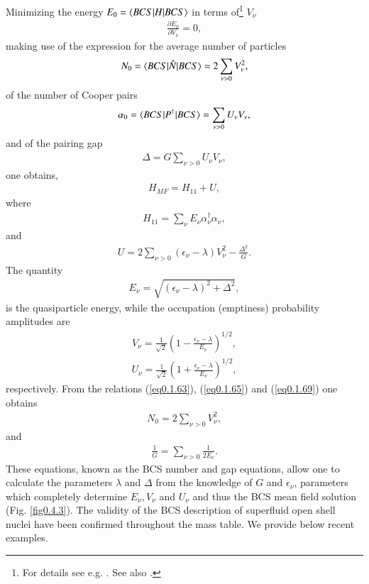 Minimizing the energy $E_0=\langle {BCS|H|BCS} \rangle$ in terms of\footnote{For details see e.g. \cite{Ragnarsson:05}. See also \cite{Nathan:65}.} $V_\nu$
\begin{align}\label{eq0.1.62}
\frac{\partial E_0}{\partial V_\nu}=0,
\end{align}
 making use of the expression for the average number of particles
\begin{align}\label{eq0.1.63}
N_0=\langle {BCS|\hat N|BCS} \rangle=2\sum_{\nu>0}V_\nu^2,
\end{align}
 of the number of Cooper pairs
\begin{align}\label{eq0.1.64}
\alpha_0=\langle {BCS|P^\dagger|BCS} \rangle=\sum_{\nu>0}U_\nu V_\nu,
\end{align}
and of the pairing gap
\begin{align}\label{eq0.1.65}
\Delta=G\sum_{\nu>0}U_\nu V_{\nu},
\end{align}
one obtains,
\begin{align}\label{eq0.1.66}
H_{MF}=H_{11}+U,
\end{align}
where 
\begin{align}\label{eq0.1.67}
H_{11}=\sum_\nu E_\nu \alpha^\dagger_\nu\alpha_\nu,
\end{align}
and
\begin{align}\label{eq0.1.68}
U=2\sum_{\nu>0}(\epsilon_\nu-\lambda)V^2_\nu-\frac{\Delta^2}{G}.
\end{align}
The quantity
\begin{align}\label{eq0.1.69}
E_\nu=\sqrt{(\epsilon_\nu-\lambda)^2+\Delta^2},
\end{align}
is the quasiparticle energy, while the occupation (emptiness) probability amplitudes are
\begin{align}\label{eq0.1.70}
V_\nu=\frac{1}{\sqrt{2}}\left(1-\frac{\epsilon_\nu-\lambda}{E_\nu}\right)^{1/2},
\end{align}
\begin{align}\label{eq0.1.71}
U_\nu=\frac{1}{\sqrt{2}}\left(1+\frac{\epsilon_\nu-\lambda}{E_\nu}\right)^{1/2},
\end{align}
 respectively. From the relations (\ref{eq0.1.63}),  (\ref{eq0.1.65}) and (\ref{eq0.1.69}) one obtains
\begin{align}\label{eq0.1.72}
N_0=2\sum_{\nu>0}V^2_\nu,
\end{align}
 and 
\begin{align}\label{eq0.1.73}
\frac{1}{G}=\sum_{\nu>0}\frac{1}{2E_\nu}.
\end{align}
These equations, known as the BCS number and gap equations, allow one to calculate the parameters $\lambda$ and $\Delta$ from the knowledge of $G$ and $\epsilon_\nu$, parameters which completely determine $E_\nu,V_\nu$ and $U_\nu$ and thus the BCS mean field solution (Fig. \ref{fig0.4.3}). The validity of the BCS description of superfluid open shell nuclei have been confirmed throughout the mass table. We provide below recent examples.

